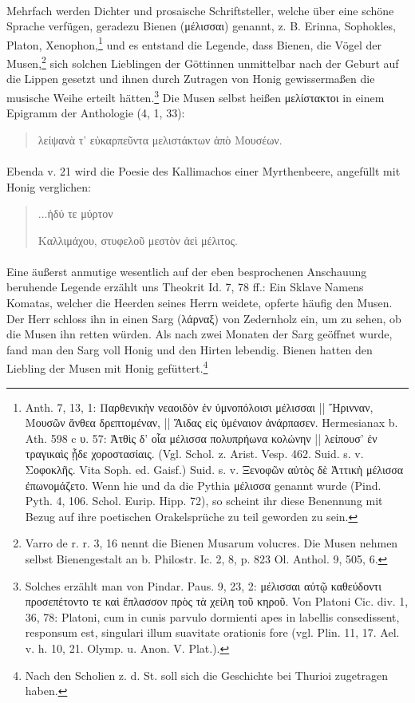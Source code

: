 \documentclass[a4paper, 11pt, oneside]{article}
\begin{document}
\paragraph{}
Mehrfach werden Dichter und prosaische Schriftsteller, welche über eine schöne Sprache verfügen, geradezu Bienen (μέλισσαι) genannt, z. B. Erinna, Sophokles, Platon, Xenophon,\footnote{Anth. 7, 13, 1: Παρθενικὴν νεαοιδὸν ἐν ὑμνοπόλοισι μέλισσαι || Ἤρινναν, Μουσῶν ἄνθεα δρεπτομέναν, || Ἅιδας εἰς ὑμέναιον ἀνάρπασεν. Hermesianax b. Ath. 598 c υ. 57: Ἀτθὶς δ' οἷα μέλισσα πολυπρήωνα κολώνην || λείπουσ' ἐν τραγικαὶς ᾖδε χοροστασίαις. (Vgl. Schol. z. Arist. Vesp. 462. Suid. s. v. Σοφοκλῆς. Vita Soph. ed. Gaisf.) Suid. s. v. Ξενοφῶν αὐτὸς δὲ Ἀττικὴ μέλισσα ἐπωνομάζετο. Wenn hie und da die Pythia μέλισσα genannt wurde (Pind. Pyth. 4, 106. Schol. Eurip. Hipp. 72), so scheint ihr diese Benennung mit Bezug auf ihre poetischen Orakelsprüche zu teil geworden zu sein.} und es entstand die Legende, dass Bienen, die Vögel der Musen,\footnote{Varro de r. r. 3, 16 nennt die Bienen Musarum volucres. Die Musen nehmen selbst Bienengestalt an b. Philostr. Ic. 2, 8, p. 823 Ol. Anthol. 9, 505, 6.} sich solchen Lieblingen der Göttinnen unmittelbar nach der Geburt auf die Lippen gesetzt und ihnen durch Zutragen von Honig gewissermaßen die musische Weihe erteilt hätten.\footnote{Solches erzählt man von Pindar. Paus. 9, 23, 2: μέλισσαι αὐτῷ καθεύδοντι προσεπέτοντο τε καὶ ἔπλασσον πρὸς τὰ χείλη τοῦ κηροῦ. Von Platoni Cic. div. 1, 36, 78: Platoni, cum in cunis parvulo dormienti apes in labellis consedissent, responsum est, singulari illum suavitate orationis fore (vgl. Plin. 11, 17. Ael. v. h. 10, 21. Olymp. u. Anon. V. Plat.).} Die Musen selbst heißen μελίστακτοι in einem Epigramm der Anthologie (4, 1, 33):
\begin{quotation}
λείψανὰ τ' εὐκαρπεῦντα μελιστάκτων ἀπὸ Μουσέων.
\end{quotation}
\paragraph{}
Ebenda v. 21 wird die Poesie des Kallimachos einer Myrthenbeere, angefüllt mit Honig verglichen:
\begin{quotation}
...ἡδύ τε μύρτον

Καλλιμάχου, στυφελοῦ μεστὸν ἀεὶ μέλιτος.
\end{quotation}
\paragraph{}
Eine äußerst anmutige wesentlich auf der eben besprochenen Anschauung beruhende Legende erzählt uns Theokrit Id. 7, 78 ff.: Ein Sklave Namens Komatas, welcher die Heerden seines Herrn weidete, opferte häufig den Musen. Der Herr schloss ihn in einen Sarg (λάρναξ) von Zedernholz ein, um zu sehen, ob die Musen ihn retten würden. Als nach zwei Monaten der Sarg geöffnet wurde, fand man den Sarg voll Honig und den Hirten lebendig. Bienen hatten den Liebling der Musen mit Honig gefüttert.\footnote{Nach den Scholien z. d. St. soll sich die Geschichte bei Thurioi zugetragen haben.}
\end{document}
